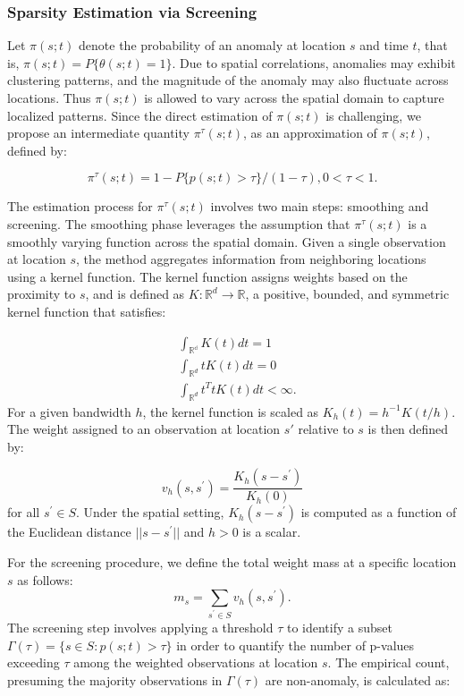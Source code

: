 \documentclass[11pt]{article}
\begin{document}
 

\subsubsection*{Sparsity Estimation via Screening}
Let $\pi(s;t)$ denote the probability of an anomaly at location $s$ and time $t$, that is, $\pi(s;t)=P\{\theta(s;t)=1\}$. Due to spatial correlations, anomalies may exhibit clustering patterns, and the magnitude of the anomaly may also fluctuate across locations. Thus $\pi(s;t)$ is allowed to vary across the spatial domain to capture localized patterns. Since the direct estimation of $\pi(s;t)$ is challenging, we propose an intermediate quantity $\pi^{\tau}(s;t)$, as an approximation of $\pi(s;t)$, defined by:

\begin{equation}
	\pi^{\tau}(s;t)=1-P\{p(s;t)>\tau\}/(1-\tau), 0<\tau<1.
\end{equation}

The estimation process for $\pi^{\tau}(s;t)$ involves two main steps: smoothing and screening. The smoothing phase leverages the assumption that $\pi^{\tau}(s;t)$ is a smoothly varying function across the spatial domain. Given a single observation at location $s$, the method aggregates information from neighboring locations using a kernel function. The kernel function assigns weights based on the proximity to $s$, and is defined as $K:\mathbb{R}^d\rightarrow\mathbb{R}$, a positive, bounded, and symmetric kernel function that satisfies:

\begin{align}
	&\int_{\mathbb{R^d}}K(t)dt=1\\
	&\int_{\mathbb{R}^d}tK(t)dt=0\\
	&\int_{\mathbb{R}^d}t^{T}tK(t)dt<\infty.
\end{align}
For a given bandwidth $h$, the kernel function is scaled as $K_h(t)=h^{-1}K(t/h)$. The weight assigned to an observation at location $s'$ relative to $s$ is then defined by:


\begin{equation}
	v_h(s,s^{\prime})=\frac{K_h(s-s^{\prime})}{K_h(0)}
\end{equation}
for all $s^{\prime} \in S$. Under the spatial setting, $K_h(s-s^{\prime})$ is computed as a function of the Euclidean distance $||s-s^{\prime}||$ and $h>0$ is a scalar.

For the screening procedure,  we define the total weight mass at a specific location $s$ as follows:
\begin{equation}
	m_s=\sum_{s^{\prime}\in S}v_h(s,s^{\prime}).
\end{equation}
The screening step involves applying a threshold $\tau$ to identify a subset $\Gamma(\tau)=\{s\in S:p(s;t)>\tau\}$ in order to quantify the number of p-values exceeding $\tau$ among the weighted observations at location $s$. The empirical count, presuming the majority observations in $\Gamma(\tau)$ are non-anomaly, is calculated as:
 
\end{document}
